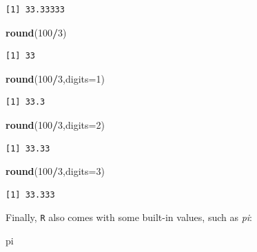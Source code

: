 \documentclass[
]{book}
\newenvironment{Shaded}{\begin{snugshade}}{\end{snugshade}}
\newcommand{\DataTypeTok}[1]{\textcolor[rgb]{0.13,0.29,0.53}{#1}}
\newcommand{\DecValTok}[1]{\textcolor[rgb]{0.00,0.00,0.81}{#1}}
\newcommand{\KeywordTok}[1]{\textcolor[rgb]{0.13,0.29,0.53}{\textbf{#1}}}
\newcommand{\NormalTok}[1]{#1}
\newcommand{\OperatorTok}[1]{\textcolor[rgb]{0.81,0.36,0.00}{\textbf{#1}}}
\begin{document}
\begin{verbatim}
[1] 33.33333
\end{verbatim}

\begin{Shaded}
\begin{Highlighting}[]
\KeywordTok{round}\NormalTok{(}\DecValTok{100}\OperatorTok{/}\DecValTok{3}\NormalTok{)}
\end{Highlighting}
\end{Shaded}

\begin{verbatim}
[1] 33
\end{verbatim}

\begin{Shaded}
\begin{Highlighting}[]
\KeywordTok{round}\NormalTok{(}\DecValTok{100}\OperatorTok{/}\DecValTok{3}\NormalTok{,}\DataTypeTok{digits=}\DecValTok{1}\NormalTok{)}
\end{Highlighting}
\end{Shaded}

\begin{verbatim}
[1] 33.3
\end{verbatim}

\begin{Shaded}
\begin{Highlighting}[]
\KeywordTok{round}\NormalTok{(}\DecValTok{100}\OperatorTok{/}\DecValTok{3}\NormalTok{,}\DataTypeTok{digits=}\DecValTok{2}\NormalTok{)}
\end{Highlighting}
\end{Shaded}

\begin{verbatim}
[1] 33.33
\end{verbatim}

\begin{Shaded}
\begin{Highlighting}[]
\KeywordTok{round}\NormalTok{(}\DecValTok{100}\OperatorTok{/}\DecValTok{3}\NormalTok{,}\DataTypeTok{digits=}\DecValTok{3}\NormalTok{)}
\end{Highlighting}
\end{Shaded}

\begin{verbatim}
[1] 33.333
\end{verbatim}

Finally, \texttt{R} also comes with some built-in values, such as \emph{pi}:

\begin{Shaded}
\begin{Highlighting}[]
\NormalTok{pi}
\end{Highlighting}
\end{Shaded}
\end{document}
